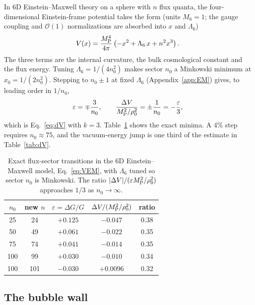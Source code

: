 \documentclass[aps,prd,reprint,superscriptaddress,nofootinbib,floatfix]{revtex4-2}
\theoremstyle{definition}
\newcommand{\MP}{M_{\rm P}}
\begin{document}
In 6D Einstein--Maxwell theory on a sphere with $n$ flux quanta, the four-dimensional Einstein-frame potential takes the form (units $M_6=1$; the gauge coupling and $\mathcal{O}(1)$ normalizations are absorbed into $x$ and $\Lambda_6$)~\cite{CarrollGuica2003,BrownDahlen2010}
\begin{equation}
V(x) = \frac{\MP^4}{4\pi}\left(-x^2 + \Lambda_6\,x + n^2x^3\right). \label{eq:VEM}
\end{equation}
The three terms are the internal curvature, the bulk cosmological constant and the flux energy. Tuning $\Lambda_6 = 1/(4n_0^2)$ makes sector $n_0$ a Minkowski minimum at $x_0=1/(2n_0^2)$. Stepping to $n_0\pm1$ at fixed $\Lambda_6$ (Appendix~\ref{app:EM}) gives, to leading order in $1/n_0$,
\begin{equation}
\varepsilon = \mp\frac{3}{n_0}, \qquad \frac{\Delta V}{\MP^2/\rho_0^2} = \pm\frac{1}{n_0} = -\frac{\varepsilon}{3}, \label{eq:EMresult}
\end{equation}
which is Eq.~\eqref{eq:dV} with $k=3$. Table~\ref{tab:EM} shows the exact minima. A $4\%$ step requires $n_0\approx75$, and the vacuum-energy jump is one third of the estimate in Table~\ref{tab:dV}.

\begin{table}[t]
\caption{Exact flux-sector transitions in the 6D Einstein--Maxwell model, Eq.~\eqref{eq:VEM}, with $\Lambda_6$ tuned so sector $n_0$ is Minkowski. The ratio $|\Delta V|/(\varepsilon\MP^2/\rho_0^2)$ approaches $1/3$ as $n_0\to\infty$.}
\label{tab:EM}
\begin{ruledtabular}
\begin{tabular}{ccccc}
$n_0$ & new $n$ & $\varepsilon=\Delta G/G$ & $\Delta V/(\MP^2/\rho_0^2)$ & ratio \\
\hline
25 & 24 & $+0.125$ & $-0.047$ & 0.38\\
50 & 49 & $+0.061$ & $-0.022$ & 0.35\\
75 & 74 & $+0.041$ & $-0.014$ & 0.35\\
100 & 99 & $+0.030$ & $-0.010$ & 0.34\\
100 & 101 & $-0.030$ & $+0.0096$ & 0.32\\
\end{tabular}
\end{ruledtabular}
\end{table}

\subsection{The bubble wall}
\end{document}
